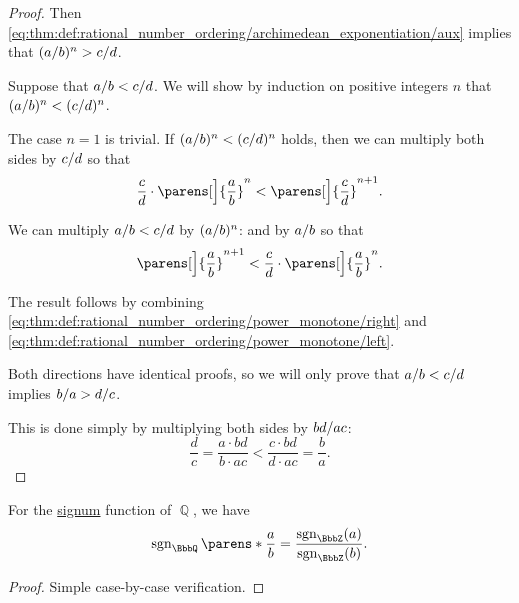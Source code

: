 \begin{proof}
  Then \eqref{eq:thm:def:rational_number_ordering/archimedean_exponentiation/aux} implies that \( (\ifrac a b)^n > \ifrac c d \).

   Suppose that \( \ifrac a b < \ifrac c d \). We will show by induction on positive integers \( n \) that \( (\ifrac a b)^n < (\ifrac c d)^n \).

  The case \( n = 1 \) is trivial. If \( (\ifrac a b)^n < (\ifrac c d)^n \) holds, then we can multiply both sides by \( \ifrac c d \) so that
  \begin{equation}\label{eq:thm:def:rational_number_ordering/power_monotone/right}
    \frac c d \cdot \parens[\Big]{ \frac a b }^n < \parens[\Big]{ \frac c d }^{n+1}.
  \end{equation}

  We can multiply \( \ifrac a b < \ifrac c d \) by \( (\ifrac a b)^n \):
  and by \( \ifrac a b \) so that
  \begin{equation}\label{eq:thm:def:rational_number_ordering/power_monotone/left}
    \parens[\Big]{ \frac a b }^{n + 1} < \frac c d \cdot \parens[\Big]{ \frac a b }^n.
  \end{equation}

  The result follows by combining \eqref{eq:thm:def:rational_number_ordering/power_monotone/right} and \eqref{eq:thm:def:rational_number_ordering/power_monotone/left}.

   Both directions have identical proofs, so we will only prove that \( \ifrac a b < \ifrac c d \) implies \( \ifrac b a > \ifrac d c \).

  This is done simply by multiplying both sides by \( \ifrac {bd} {ac} \):
  \begin{equation*}
    \frac d c = \frac {a \cdot bd} {b \cdot ac} < \frac {c \cdot bd} {d \cdot ac} = \frac b a.
  \end{equation*}
\end{proof}

\begin{proposition}\label{thm:rational_number_signum}\mimprovised
  For the \hyperref[def:totally_ordered_ring_signum]{signum} function of \( \BbbQ \), we have
  \begin{equation*}
    \sgn_\BbbQ\parens*{ \frac a b } = \frac {\sgn_\BbbZ(a)} {\sgn_\BbbZ(b)}.
  \end{equation*}
\end{proposition}
\begin{proof}
  Simple case-by-case verification.
\end{proof}

